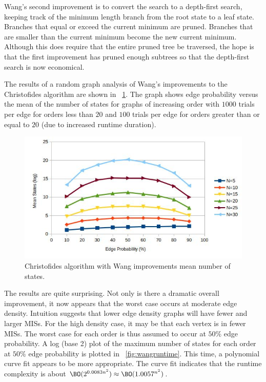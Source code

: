 Wang's second improvement is to convert the search to a depth-first search, keeping track of the minimum length
branch from the root state to a leaf state.  Branches that equal or exceed the current minimum are pruned.
Branches that are smaller than the current minimum become the new current minimum.  Although this does require that
the entire pruned tree be traversed, the hope is that the first improvement has pruned enough subtrees so that the
depth-first search is now economical.

The results of a random graph analysis of Wang's improvements to the Christofides algorithm are shown in
\figurename~\ref{fig:wangstates}.  The graph shows edge probability versus the mean of the number of states for
graphs of increasing order with \(1000\) trials per edge for orders less than \(20\) and \(100\) trials per edge
for orders greater than or equal to \(20\) (due to increased runtime duration).

\begin{figure}[H]
  \centering
  \includegraphics[width=5in]{wang_states}
  \caption{Christofides algorithm with Wang improvements mean number of states.}
  \label{fig:wangstates}
\end{figure}

The results are quite surprising.  Not only is there a dramatic overall improvement, it now appears that the worst
case occurs at moderate edge density.  Intuition suggests that lower edge density graphs will have fewer and larger
MISs.  For the high density case, it may be that each vertex is in fewer MISs.  The worst case for each order is
thus assumed to occur at \(50\%\) edge probability.  A log (base 2) plot of the maximum number of states for each
order at \(50\%\) edge probability is plotted in \figurename~\ref{fig:wangruntime}.  This time, a polynomial curve
fit appears to be more appropriate.  The curve fit indicates that the runtime complexity is about
\(\BO(2^{0.0083n^2})\approx\BO(1.0057^{n^2})\).

